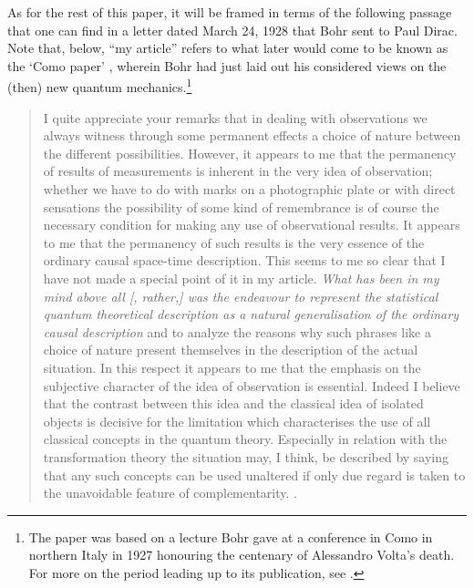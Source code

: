 \documentclass[12pt,english,twoside]{article}
\numberwithin{equation}{section}
\begin{document}
As for the rest of this paper, it will be framed in terms of the following passage that one can find in a letter dated March 24, 1928 that Bohr sent to Paul Dirac. Note that, below, ``my article'' refers to what later would come to be known as the `Como paper' \citep[]{bohr1928}, wherein Bohr had just laid out his considered views on the (then) new quantum mechanics.\footnote{The paper was based on a lecture Bohr gave at a conference in Como in northern Italy in 1927 honouring the centenary of Alessandro Volta's death. For more on the period leading up to its publication, see \citet[]{degregorio2014}.}

\begin{quote}
  I quite appreciate your remarks that in dealing with observations we always witness through some permanent effects a choice of nature between the different possibilities. However, it appears to me that the permanency of results of measurements is inherent in the very idea of observation; whether we have to do with marks on a photographic plate or with direct sensations the possibility of some kind of remembrance is of course the necessary condition for making any use of observational results. It appears to me that the permanency of such results is the very essence of the ordinary causal space-time description. This seems to me so clear that I have not made a special point of it in my article. \emph{What has been in my mind above all [, rather,] was the endeavour to represent the statistical quantum theoretical description as a natural generalisation of the ordinary causal description} and to analyze the reasons why such phrases like a choice of nature present themselves in the description of the actual situation. In this respect it appears to me that the emphasis on the subjective character of the idea of observation is essential. Indeed I believe that the contrast between this idea and the classical idea of isolated objects is decisive for the limitation which characterises the use of all classical concepts in the quantum theory. Especially in relation with the transformation theory the situation may, I think, be described by saying that any such concepts can be used unaltered if only due regard is taken to the unavoidable feature of complementarity. \citep[pp. 45--46, emphasis mine]{bohrToDirac1928}.
\end{quote}
\end{document}
